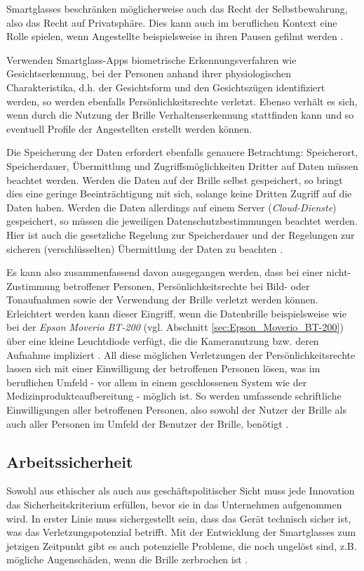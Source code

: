 Smartglasses beschränken möglicherweise auch das Recht der Selbstbewahrung, also das Recht auf Privatsphäre. Dies kann auch im beruflichen Kontext eine Rolle spielen, wenn Angestellte beispielsweise in ihren Pausen gefilmt werden \cite[S.~114f]{Schwenke2016}.

Verwenden Smartglass-Apps biometrische Erkennungsverfahren wie Gesichtserkennung, bei der Personen anhand ihrer physiologischen Charakteristika, d.h. der Gesichtsform und den Gesichtszügen identifiziert werden, so werden ebenfalls Persönlichkeitsrechte verletzt. Ebenso verhält es sich, wenn durch die Nutzung der Brille Verhaltenserkennung stattfinden kann und so eventuell Profile der Angestellten erstellt werden können.

Die Speicherung der Daten erfordert ebenfalls genauere Betrachtung: Speicherort, Speicherdauer, Übermittlung und Zugriffsmöglichkeiten Dritter auf Daten müssen beachtet werden. Werden die Daten auf der Brille selbst gespeichert, so bringt dies eine geringe Beeinträchtigung mit sich, solange keine Dritten Zugriff auf die Daten haben. Werden die Daten allerdings auf einem Server (\emph{Cloud-Dienste}) gespeichert, so müssen die jeweiligen Datenschutzbestimmungen beachtet werden. Hier ist auch die gesetzliche Regelung zur Speicherdauer und der Regelungen zur sicheren (verschlüsselten) Übermittlung der Daten zu beachten \cite[S.~165f]{Schwenke2016}.

Es kann also zusammenfassend davon ausgegangen werden, dass bei einer nicht- Zustimmung betroffener Personen, Persönlichkeitsrechte bei Bild- oder Tonaufnahmen sowie der Verwendung der Brille verletzt werden können. Erleichtert werden kann dieser Eingriff, wenn die Datenbrille beispielsweise wie bei der \emph{Epson Moverio BT-200} (vgl. Abschnitt \ref{sec:Epson_Moverio_BT-200}) über eine kleine Leuchtdiode verfügt, die die Kameranutzung bzw. deren Aufnahme impliziert \cite[S.~161]{Schwenke2016}. All diese möglichen Verletzungen der Persönlichkeitsrechte lassen sich mit einer Einwilligung der betroffenen Personen lösen, was im beruflichen Umfeld - vor allem in einem geschlossenen System wie der Medizinprodukteaufbereitung - möglich ist. So werden umfassende schriftliche Einwilligungen aller betroffenen Personen, also sowohl der Nutzer der Brille als auch aller Personen im Umfeld der Benutzer der Brille, benötigt \cite[S.~139f]{Schwenke2016}.
%
%
%
%
%
%
%
\subsection{Arbeitssicherheit}
\label{sec:Arbeitssicherheit}
Sowohl aus ethischer als auch aus geschäftspolitischer Sicht muss jede Innovation das Sicherheitskriterium erfüllen, bevor sie in das Unternehmen aufgenommen wird. In erster Linie muss sichergestellt sein, dass das Gerät technisch sicher ist, was das Verletzungspotenzial betrifft. Mit der Entwicklung der Smartglasses zum jetzigen Zeitpunkt gibt es auch potenzielle Probleme, die noch ungelöst sind, z.B. mögliche Augenschäden, wenn die Brille zerbrochen ist \cite{Hein2016}.
%
%

